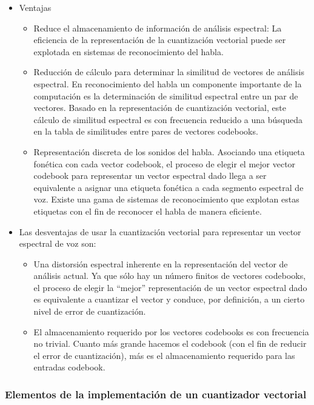 \begin{itemize}
\item	Ventajas
\begin{itemize}
\item	Reduce el almacenamiento de información de análisis espectral: La eficiencia de la representación de la cuantización vectorial puede ser explotada en sistemas de reconocimiento del habla.
\item	Reducción de cálculo para determinar la similitud de vectores de análisis espectral. En reconocimiento del habla un componente importante de la computación es la determinación de similitud espectral entre un par de vectores.  Basado en la representación de cuantización vectorial, este cálculo de similitud espectral es con frecuencia reducido a una búsqueda en la tabla de similitudes entre pares de vectores codebooks.
\item	Representación discreta de los sonidos del habla. Asociando una etiqueta fonética con cada vector codebook, el proceso de elegir el mejor vector codebook para representar un vector espectral dado llega a ser equivalente a asignar una etiqueta fonética a cada segmento espectral de voz. Existe una gama de sistemas de reconocimiento que explotan estas etiquetas con el fin de reconocer el habla de manera eficiente.
\end{itemize}
\item	Las desventajas de usar la cuantización vectorial para representar un vector espectral de voz son:
\begin{itemize}
\item	Una distorsión espectral inherente en la representación del vector de análisis actual. Ya que sólo hay un número finitos de vectores codebooks, el proceso de elegir la “mejor” representación de un vector espectral dado es equivalente a cuantizar el vector y conduce, por definición, a un cierto nivel de error de cuantización.
\item	El almacenamiento requerido por los vectores codebooks es con frecuencia no trivial. Cuanto más grande hacemos el codebook (con el fin de reducir el error de cuantización), más es el almacenamiento requerido para las entradas codebook.
\end{itemize}
\end{itemize}

\subsubsection{Elementos de la implementación de un cuantizador vectorial}

